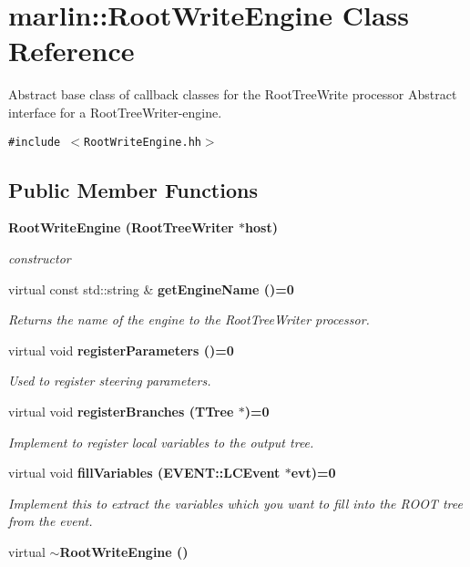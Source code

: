 \section{marlin::Root\-Write\-Engine Class Reference}
\label{classmarlin_1_1RootWriteEngine}
Abstract base class of callback classes for the Root\-Tree\-Write processor Abstract interface for a Root\-Tree\-Writer-engine.  


{\tt \#include $<$Root\-Write\-Engine.hh$>$}

\subsection*{Public Member Functions}
\begin{CompactItemize}
\item 
\bf{Root\-Write\-Engine} (Root\-Tree\-Writer $\ast$host)
\begin{CompactList}\small\item\em constructor \item\end{CompactList}\item 
virtual const std::string \& \bf{get\-Engine\-Name} ()=0
\begin{CompactList}\small\item\em Returns the name of the engine to the Root\-Tree\-Writer processor. \item\end{CompactList}\item 
virtual void \bf{register\-Parameters} ()=0
\begin{CompactList}\small\item\em Used to register steering parameters. \item\end{CompactList}\item 
virtual void \bf{register\-Branches} (TTree $\ast$)=0
\begin{CompactList}\small\item\em Implement to register local variables to the output tree. \item\end{CompactList}\item 
virtual void \bf{fill\-Variables} (EVENT::LCEvent $\ast$evt)=0
\begin{CompactList}\small\item\em Implement this to extract the variables which you want to fill into the {\em ROOT\/} tree from the event. \item\end{CompactList}\item 
virtual \bf{$\sim$Root\-Write\-Engine} ()\label{classmarlin_1_1RootWriteEngine_5f541fb340518942be78e4ee69d87edf}

\end{CompactItemize}
